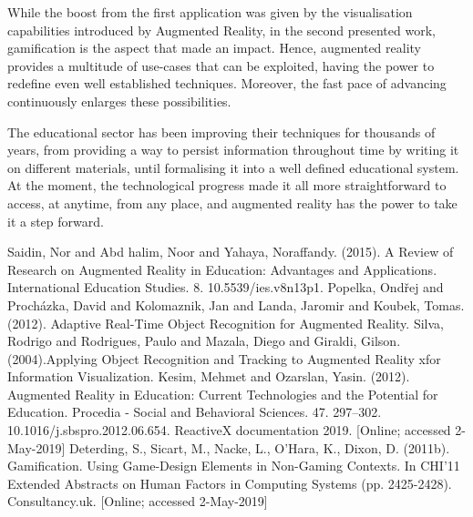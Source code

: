 \documentclass[12 pct]{report}
\begin{document}
While the boost from the first application was given by the visualisation capabilities introduced by Augmented Reality, in the second presented work, gamification is the aspect that made an impact. Hence, augmented reality provides a multitude of use-cases that can be exploited, having the power to redefine even well established techniques. Moreover, the fast pace of advancing continuously enlarges these possibilities.

The educational sector has been improving their techniques for thousands of years, from providing a way to persist information throughout time by writing it on different materials, until formalising it into a well defined educational system. At the moment, the technological progress made it all more straightforward to access, at anytime, from any place, and augmented reality has the power to take it a step forward.

\begin{thebibliography}{3}
Saidin, Nor and Abd halim, Noor and Yahaya, Noraffandy. (2015). A Review of Research on Augmented Reality in Education: Advantages and Applications. International Education Studies. 8. 10.5539/ies.v8n13p1. 
Popelka, Ondřej and Procházka, David and Kolomaznik, Jan and Landa, Jaromir and Koubek, Tomas. (2012). Adaptive Real-Time Object Recognition for Augmented Reality. 
Silva, Rodrigo and Rodrigues, Paulo and Mazala, Diego and Giraldi, Gilson. (2004).Applying Object Recognition and Tracking to Augmented Reality xfor Information Visualization. 
Kesim, Mehmet and Ozarslan, Yasin. (2012). Augmented Reality in Education: Current Technologies and the Potential for Education. Procedia - Social and Behavioral Sciences. 47. 297–302. 10.1016/j.sbspro.2012.06.654. 
ReactiveX documentation 2019. [Online; accessed 2-May-2019]
Deterding, S., Sicart, M., Nacke, L., O'Hara, K., Dixon, D. (2011b). Gamification. Using Game-Design Elements in Non-Gaming Contexts. In CHI'11 Extended Abstracts on Human Factors in Computing Systems (pp. 2425-2428).
 Consultancy.uk. [Online; accessed 2-May-2019]
\end{thebibliography}
\end{document}
